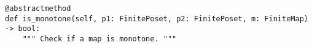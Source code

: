 \par\begin{minipage}{78ex}
\begin{verbatim}
@abstractmethod
def is_monotone(self, p1: FinitePoset, p2: FinitePoset, m: FiniteMap) -> bool:
    """ Check if a map is monotone. """
\end{verbatim}
\end{minipage}\par